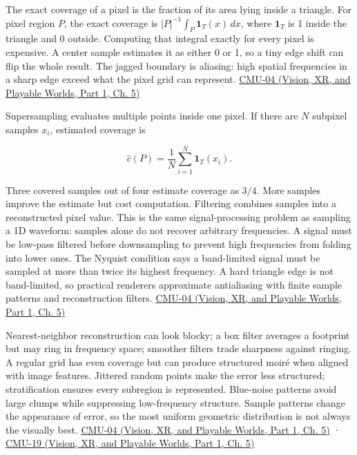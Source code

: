 The exact coverage of a pixel is the fraction of its area lying inside a triangle. For pixel region \(P\), the exact coverage is \(|P|^{-1}\int_P \mathbf 1_T(x)\,dx\), where \(\mathbf 1_T\) is 1 inside the triangle and 0 outside. Computing that integral exactly for every pixel is expensive. A center sample estimates it as either 0 or 1, so a tiny edge shift can flip the whole result. The jagged boundary is aliasing: high spatial frequencies in a sharp edge exceed what the pixel grid can represent. \href{../07-Vision-XR-and-Playable-Worlds-P01/main.pdf\#nameddest=04-visual-computing-ii-ch036-cmu-04---drawing-a-triangle-and-an-intro-to-sampling}{CMU-04 (Vision, XR, and Playable Worlds, Part 1, Ch. 5)}

Supersampling evaluates multiple points inside one pixel. If there are \(N\) subpixel samples \(x_i\), estimated coverage is

\[
\widehat c(P)=\frac1N\sum_{i=1}^N\mathbf 1_T(x_i).
\]

Three covered samples out of four estimate coverage as \(3/4\). More samples improve the estimate but cost computation. Filtering combines samples into a reconstructed pixel value. This is the same signal-processing problem as sampling a 1D waveform: samples alone do not recover arbitrary frequencies. A signal must be low-pass filtered before downsampling to prevent high frequencies from folding into lower ones. The Nyquist condition says a band-limited signal must be sampled at more than twice its highest frequency. A hard triangle edge is not band-limited, so practical renderers approximate antialiasing with finite sample patterns and reconstruction filters. \href{../07-Vision-XR-and-Playable-Worlds-P01/main.pdf\#nameddest=04-visual-computing-ii-ch036-cmu-04---drawing-a-triangle-and-an-intro-to-sampling}{CMU-04 (Vision, XR, and Playable Worlds, Part 1, Ch. 5)}

Nearest-neighbor reconstruction can look blocky; a box filter averages a footprint but may ring in frequency space; smoother filters trade sharpness against ringing. A regular grid has even coverage but can produce structured moiré when aligned with image features. Jittered random points make the error less structured; stratification ensures every subregion is represented. Blue-noise patterns avoid large clumps while suppressing low-frequency structure. Sample patterns change the appearance of error, so the most uniform geometric distribution is not always the visually best. \href{../07-Vision-XR-and-Playable-Worlds-P01/main.pdf\#nameddest=04-visual-computing-ii-ch036-cmu-04---drawing-a-triangle-and-an-intro-to-sampling}{CMU-04 (Vision, XR, and Playable Worlds, Part 1, Ch. 5)} · \href{../07-Vision-XR-and-Playable-Worlds-P01/main.pdf\#nameddest=04-visual-computing-ii-ch036-cmu-19---variance-reduction}{CMU-19 (Vision, XR, and Playable Worlds, Part 1, Ch. 5)}


